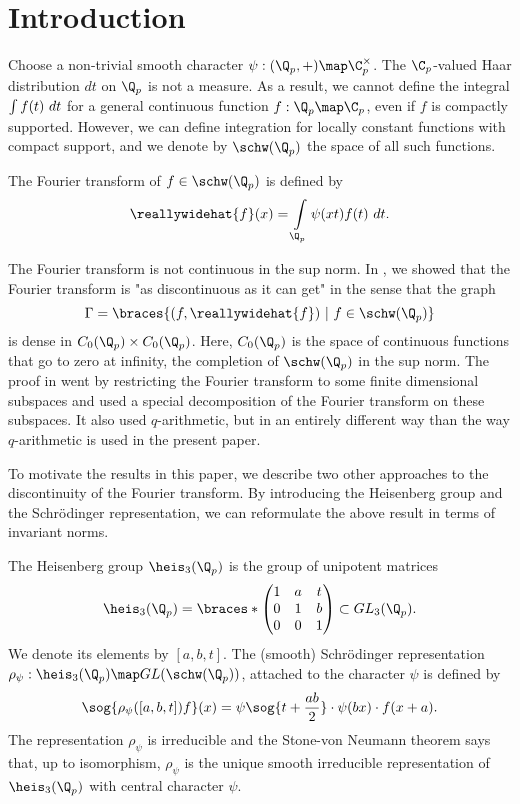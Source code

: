 
\section{Introduction}
Choose a non-trivial smooth character $\psi:(\Q_p,+)\map \C_p^\times$.
The $\C_p$-valued Haar distribution $dt$ on $\Q_p$ is not a measure.
As a result, we cannot define the integral $\intop f(t)\ dt$ for a general continuous function $f:\Q_p\map\C_p$, even if $f$ is compactly supported.
However, we can define integration for locally constant functions with compact support, and we denote by $\schw(\Q_p)$ the space of all such functions.

The Fourier transform of $f\in \schw(\Q_p)$ is defined by
\[\reallywidehat{f}(x)=\intop_{\Q_p}\psi(xt)f(t)\ dt.\]

The Fourier transform is not continuous in the sup norm.
In \cite{ophir2016q}, we showed that the Fourier transform is "as discontinuous as it can get" in the sense that the graph
\[\Gamma=\braces{(f,\reallywidehat{f})\ |\ f\in\schw(\Q_p)}\]
is dense in $C_0(\Q_p)\times C_0(\Q_p)$.
Here, $C_0(\Q_p)$ is the space of continuous functions that go to zero at infinity, the completion of $\schw(\Q_p)$ in the sup norm. 
The proof in \cite{ophir2016q} went by restricting the Fourier transform to some finite dimensional subspaces and used a special decomposition of the Fourier transform on these subspaces. 
It also used $q$-arithmetic, but in an entirely different way than the way $q$-arithmetic is used in the present paper.

To motivate the results in this paper, we describe two other approaches to the discontinuity of the Fourier transform.
By introducing the Heisenberg group and the Schrödinger representation, we can reformulate the above result in terms of invariant norms.

The Heisenberg group $\heis_3(\Q_p)$ is the group of unipotent matrices
\[\heis_3(\Q_p)=\braces*{
\begin{pmatrix}
1 & a & t\\
0 & 1 & b\\
0 & 0 & 1
\end{pmatrix}
}\subset GL_3(\Q_p).\]
We denote its elements by $[a,b,t]$.
The (smooth) Schrödinger representation $\rho_\psi:\heis_3(\Q_p)\map GL(\schw(\Q_p))$, attached to the character $\psi$ is defined by
\[\sog{\rho_\psi([a,b,t])f}(x)=\psi\sog{t+\frac{ab}{2}}\cdot \psi(bx)\cdot f(x+a).\]
The representation $\rho_\psi$ is irreducible and the Stone-von Neumann theorem says that, up to isomorphism, $\rho_\psi$ is the unique smooth irreducible representation of $\heis_3(\Q_p)$ with central character $\psi$.

